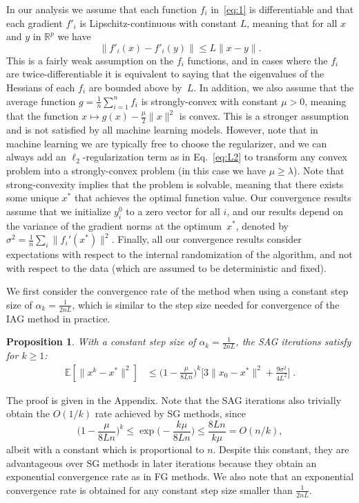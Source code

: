 \documentclass{article}
\newtheorem{proposition}{Proposition}
\newcommand{\mysec}[1]{Section~\ref{sec:#1}}
\def\Real{\mathbb{R}}
\def\norm#1{\|#1\|}
\begin{document}
In our analysis we assume that each
function $f_i$ in~\eqref{eq:1} is
differentiable and that each gradient $f'_i$ is Lipschitz-continuous with
constant $L$, meaning that for all $x$ and $y$ in $\Real^p$ we have
\[
\norm{f'_i(x)-f'_i(y)}\leq L\norm{x-y}.
\]
This is a fairly weak assumption on the $f_i$ functions, and in cases where
the $f_i$ are twice-differentiable it is equivalent to saying that the
eigenvalues of the Hessians of each $f_i$ are bounded above by~$L$.  In addition, we also assume that the average function $g =
\frac{1}{n}\sum_{i=1}^n f_i$ is strongly-convex with constant $\mu > 0$, meaning that
the function $x \mapsto g(x) - \frac{\mu}{2}\norm{x}^2$ is convex. This is a stronger assumption and is not satisfied by all machine
learning models.  However, note that in machine learning we are typically free to
choose the regularizer, and we can always add an $\ell_2$-regularization term as in Eq.~\eqref{eq:L2}
to transform any convex problem into a strongly-convex problem (in
this case we have $\mu \geq \lambda$).
Note that strong-convexity implies that the problem is solvable, meaning that there exists some unique $x^\ast$ that achieves
the optimal function value.  Our convergence results assume that we initialize $y_i^0$
to a zero vector for all $i$,
and our results depend on the variance of the gradient norms at the optimum~$x^\ast$, denoted by $\sigma^2 = \frac{1}{n} \sum_i \|f_i'(x^\ast)\|^2$.
Finally, all our convergence results consider expectations with respect to the internal randomization of the algorithm, and not with respect to the data (which are assumed to be deterministic and fixed).

We first consider the convergence rate of the method when using a constant
step size of $\alpha_k = \frac{1}{2nL}$, which is similar to the step size
needed for convergence of the IAG method in practice.
\begin{proposition}
\label{prop:small_alpha}
With a constant step size of $\alpha_k = \frac{1}{2nL}$, the SAG iterations satisfy for $k \geq 1$:
\begin{align*}
\mathbb{E}\left[\|x^k - x^\ast\|^2\right] &\leqslant \Big(1 - \frac{\mu}{8Ln}\Big)^k\Big[3\|x_0
- x^\ast\|^2 + \frac{9\sigma^2}{4L^2}\Big]  \; .
\end{align*}
\end{proposition}
The proof is given in the Appendix.  
Note that the SAG iterations also trivially obtain the $O(1/k)$
rate achieved by SG methods, since
\[
\Big(1 - \frac{\mu}{8Ln}\Big)^k \leqslant \exp\Big(- \frac{k\mu}{8Ln}\Big) \leqslant \frac{ 8 Ln}{k \mu} =  O(n/k),
\]
albeit with a constant which is proportional to $n$.  Despite this constant, they are
advantageous over SG methods in later iterations because they obtain an exponential convergence rate as in FG methods. We also note that an exponential convergence rate is obtained for any constant step size smaller than $\frac{1}{2nL}$.
\end{document}
